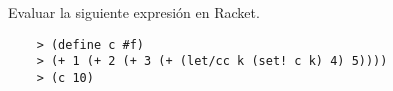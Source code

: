 Evaluar la siguiente expresión en Racket.

\begin{verbatim}
    > (define c #f)
    > (+ 1 (+ 2 (+ 3 (+ (let/cc k (set! c k) 4) 5))))
    > (c 10)
\end{verbatim}
